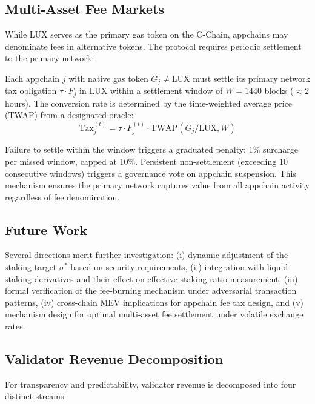 \subsection{Multi-Asset Fee Markets}

While LUX serves as the primary gas token on the C-Chain, appchains may denominate fees in alternative tokens. The protocol requires periodic settlement to the primary network:

\begin{definition}
Each appchain $j$ with native gas token $G_j \neq \text{LUX}$ must settle its primary network tax obligation $\tau \cdot F_j$ in LUX within a settlement window of $W = 1440$ blocks ($\approx 2$ hours). The conversion rate is determined by the time-weighted average price (TWAP) from a designated oracle:
\begin{equation}
    \text{Tax}_j^{(t)} = \tau \cdot F_j^{(t)} \cdot \text{TWAP}(G_j/\text{LUX}, W)
\end{equation}
\end{definition}

Failure to settle within the window triggers a graduated penalty: 1\% surcharge per missed window, capped at 10\%. Persistent non-settlement (exceeding 10 consecutive windows) triggers a governance vote on appchain suspension. This mechanism ensures the primary network captures value from all appchain activity regardless of fee denomination.

\subsection{Future Work}

Several directions merit further investigation: (i) dynamic adjustment of the staking target $\sigma^*$ based on security requirements, (ii) integration with liquid staking derivatives and their effect on effective staking ratio measurement, (iii) formal verification of the fee-burning mechanism under adversarial transaction patterns, (iv) cross-chain MEV implications for appchain fee tax design, and (v) mechanism design for optimal multi-asset fee settlement under volatile exchange rates.

\subsection{Validator Revenue Decomposition}

For transparency and predictability, validator revenue is decomposed into four distinct streams:

